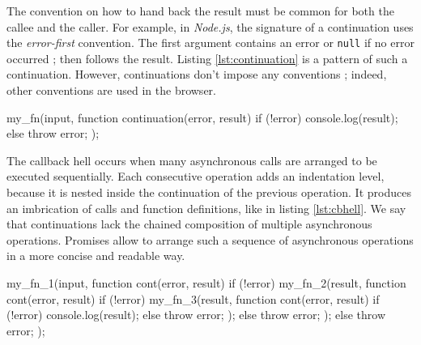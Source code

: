 The convention on how to hand back the result must be common for both the callee and the caller.
For example, in \textit{Node.js}, the signature of a continuation uses the \textit{error-first} convention.
The first argument contains an error or \texttt{null} if no error occurred ; then follows the result.
Listing \ref{lst:continuation} is a pattern of such a continuation.
However, continuations don't impose any conventions ; indeed, other conventions are used in the browser.

\begin{code}[js, %
             caption={Example of a continuation}, %
             label={lst:continuation}] %
my_fn(input, function continuation(error, result) {
  if (!error) {
    console.log(result);
  } else {
    throw error;
  }
});
\end{code}

The callback hell occurs when many asynchronous calls are arranged to be executed sequentially.
Each consecutive operation adds an indentation level, because it is nested inside the continuation of the previous operation.
It produces an imbrication of calls and function definitions, like in listing \ref{lst:cbhell}.
We say that continuations lack the chained composition of multiple asynchronous operations.
Promises allow to arrange such a sequence of asynchronous operations in a more concise and readable way.


\begin{code}[js, %
             caption={Example of a sequence of continuations}, %
             label={lst:cbhell}] %
my_fn_1(input, function cont(error, result) {
  if (!error) {
    my_fn_2(result, function cont(error, result) {
      if (!error) {
        my_fn_3(result, function cont(error, result) {
          if (!error) {
            console.log(result);
          } else {
            throw error;
          }
        });
      } else {
        throw error;
      }
    });
  } else {
    throw error;
  }
});
\end{code}

